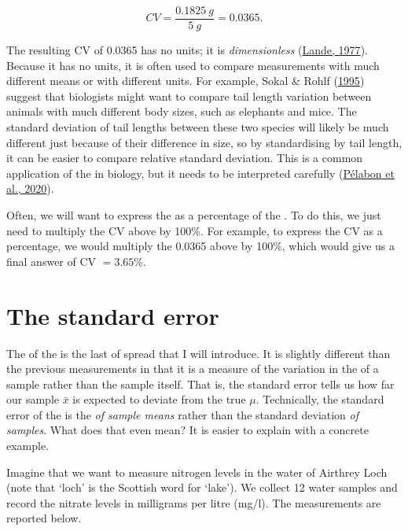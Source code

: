 \documentclass[
  openany]{krantz}
\begin{document}
\[CV = \frac{0.1825\:g}{5\:g} = 0.0365.\]

The resulting CV of 0.0365 has no units; it is \emph{dimensionless} (\protect\hyperlink{ref-Lande1977}{Lande, 1977}).
Because it has no units, it is often used to compare measurements with much different means or with different  units.
For example, Sokal \& Rohlf (\protect\hyperlink{ref-Sokal1995}{1995}) suggest that biologists might want to compare tail length variation between animals with much different body sizes, such as elephants and mice.
The standard deviation of tail lengths between these two species will likely be much different just because of their difference in size, so by standardising by  tail length, it can be easier to compare relative standard deviation.
This is a common application of the  in biology, but it needs to be interpreted carefully (\protect\hyperlink{ref-Pelabon2020}{Pélabon et al., 2020}).

Often, we will want to express the  as a percentage of the .
To do this, we just need to multiply the CV above by 100\%.
For example, to express the CV as a percentage, we would multiply the 0.0365 above by 100\%, which would give us a final answer of CV \(= 3.65\)\%.

\hypertarget{the-standard-error}{%
\section{The standard error}\label{the-standard-error}}

The  of the  is the last  of spread that I will introduce.
It is slightly different than the previous measurements in that it is a measure of the variation in the \emph{} of a sample rather than the sample itself.
That is, the standard error tells us how far our sample  \(\bar{x}\) is expected to deviate from the true  \(\mu\).
Technically, the standard error of the  is the  \emph{of sample means} rather than the standard deviation \emph{of samples}.
What does that even mean?
It is easier to explain with a concrete example.

Imagine that we want to measure nitrogen levels in the water of Airthrey Loch (note that `loch' is the Scottish word for `lake').
We collect 12 water samples and record the nitrate levels in milligrams per litre (mg/l).
The measurements are reported below.
\end{document}
